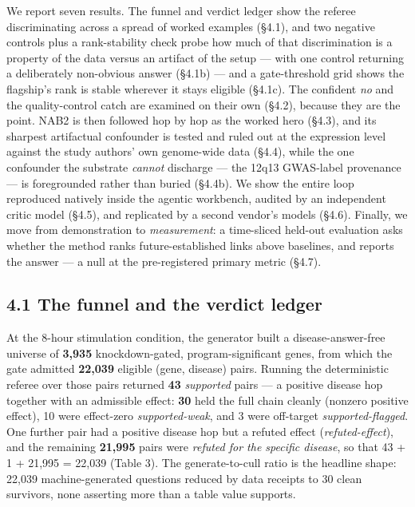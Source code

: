 We report seven results. The funnel and verdict ledger show the referee discriminating across a spread of
worked examples (\S{}4.1), and two negative controls plus a rank-stability check probe how much of that
discrimination is a property of the data versus an artifact of the setup --- with one control returning a
deliberately non-obvious answer (\S{}4.1b) --- and a gate-threshold grid shows the flagship's rank is
stable wherever it stays eligible (\S{}4.1c). The confident \emph{no} and the quality-control
catch are examined on their own (\S{}4.2), because they are the point. NAB2 is then followed hop by hop as the
worked hero (\S{}4.3), and its sharpest artifactual confounder is tested and ruled out at the expression level against the study authors' own
genome-wide data (\S{}4.4), while the one confounder the substrate \emph{cannot} discharge --- the 12q13
GWAS-label provenance --- is foregrounded rather than buried (\S{}4.4b). We show the entire loop reproduced natively inside the agentic workbench,
audited by an independent critic model (\S{}4.5), and replicated by a second vendor's models (\S{}4.6).
Finally, we move from demonstration to \emph{measurement}: a time-sliced held-out evaluation asks whether the
method ranks future-established links above baselines, and reports the answer --- a null at the pre-registered
primary metric (\S{}4.7).

\subsection*{4.1 The funnel and the verdict ledger}\label{the-funnel-and-the-verdict-ledger}

At the 8-hour stimulation condition, the generator built a disease-answer-free universe of \textbf{3,935}
knockdown-gated, program-significant genes, from which the gate admitted \textbf{22,039} eligible
(gene, disease) pairs. Running the deterministic referee over those pairs returned \textbf{43} \emph{supported} pairs --- a positive
disease hop together with an admissible effect: \textbf{30} held the full chain cleanly (nonzero positive
effect), 10 were effect-zero \emph{supported-weak}, and 3 were off-target \emph{supported-flagged}. One
further pair had a positive disease hop but a refuted effect (\emph{refuted-effect}), and the remaining
\textbf{21,995} pairs were \emph{refuted for the specific disease}, so that 43 + 1 + 21,995 = 22,039
(Table 3). The generate-to-cull ratio is the headline
shape: 22,039 machine-generated questions reduced by data receipts to 30 clean survivors, none asserting
more than a table value supports.

